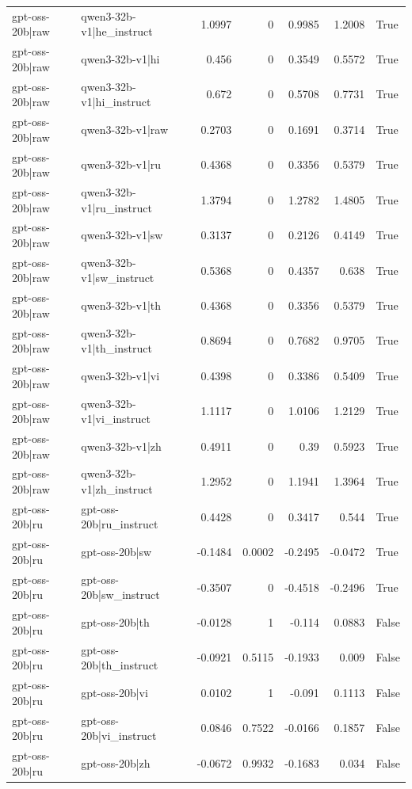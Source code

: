 \begin{table}
\begin{tabular}{l l r r r r l}
gpt-oss-20b|raw & qwen3-32b-v1|he_instruct & 1.0997 & 0 & 0.9985 & 1.2008 & True \\
gpt-oss-20b|raw & qwen3-32b-v1|hi & 0.456 & 0 & 0.3549 & 0.5572 & True \\
gpt-oss-20b|raw & qwen3-32b-v1|hi_instruct & 0.672 & 0 & 0.5708 & 0.7731 & True \\
gpt-oss-20b|raw & qwen3-32b-v1|raw & 0.2703 & 0 & 0.1691 & 0.3714 & True \\
gpt-oss-20b|raw & qwen3-32b-v1|ru & 0.4368 & 0 & 0.3356 & 0.5379 & True \\
gpt-oss-20b|raw & qwen3-32b-v1|ru_instruct & 1.3794 & 0 & 1.2782 & 1.4805 & True \\
gpt-oss-20b|raw & qwen3-32b-v1|sw & 0.3137 & 0 & 0.2126 & 0.4149 & True \\
gpt-oss-20b|raw & qwen3-32b-v1|sw_instruct & 0.5368 & 0 & 0.4357 & 0.638 & True \\
gpt-oss-20b|raw & qwen3-32b-v1|th & 0.4368 & 0 & 0.3356 & 0.5379 & True \\
gpt-oss-20b|raw & qwen3-32b-v1|th_instruct & 0.8694 & 0 & 0.7682 & 0.9705 & True \\
gpt-oss-20b|raw & qwen3-32b-v1|vi & 0.4398 & 0 & 0.3386 & 0.5409 & True \\
gpt-oss-20b|raw & qwen3-32b-v1|vi_instruct & 1.1117 & 0 & 1.0106 & 1.2129 & True \\
gpt-oss-20b|raw & qwen3-32b-v1|zh & 0.4911 & 0 & 0.39 & 0.5923 & True \\
gpt-oss-20b|raw & qwen3-32b-v1|zh_instruct & 1.2952 & 0 & 1.1941 & 1.3964 & True \\
gpt-oss-20b|ru & gpt-oss-20b|ru_instruct & 0.4428 & 0 & 0.3417 & 0.544 & True \\
gpt-oss-20b|ru & gpt-oss-20b|sw & -0.1484 & 0.0002 & -0.2495 & -0.0472 & True \\
gpt-oss-20b|ru & gpt-oss-20b|sw_instruct & -0.3507 & 0 & -0.4518 & -0.2496 & True \\
gpt-oss-20b|ru & gpt-oss-20b|th & -0.0128 & 1 & -0.114 & 0.0883 & False \\
gpt-oss-20b|ru & gpt-oss-20b|th_instruct & -0.0921 & 0.5115 & -0.1933 & 0.009 & False \\
gpt-oss-20b|ru & gpt-oss-20b|vi & 0.0102 & 1 & -0.091 & 0.1113 & False \\
gpt-oss-20b|ru & gpt-oss-20b|vi_instruct & 0.0846 & 0.7522 & -0.0166 & 0.1857 & False \\
gpt-oss-20b|ru & gpt-oss-20b|zh & -0.0672 & 0.9932 & -0.1683 & 0.034 & False \\

\end{tabular}
\end{table}
